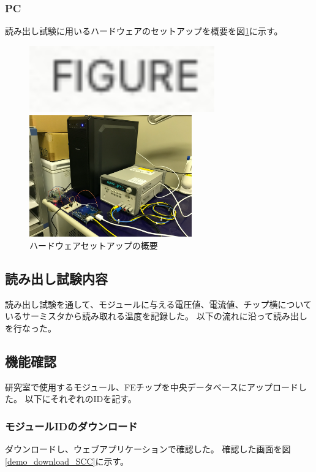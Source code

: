 \subsubsection{PC}
読み出し試験に用いるハードウェアのセットアップを概要を図\ref{readout_setup_overview}に示す。

\begin{figure}[bpt]\centering
  \begin{minipage}{0.5\hsize}
    \includegraphics[width=8cm]{figure}
  \end{minipage}
  \begin{minipage}{0.5\hsize}
    \includegraphics[width=7cm]{HW_setup_pic}
  \end{minipage}
\caption[ハードウェアセットアップの概要]{ハードウェアセットアップの概要}
\label{readout_setup_overview}
\end{figure}

\subsection{読み出し試験内容}
読み出し試験を通して、モジュールに与える電圧値、電流値、チップ横についているサーミスタから読み取れる温度を記録した。
以下の流れに沿って読み出しを行なった。

\subsection{機能確認}
研究室で使用するモジュール、FEチップを中央データベースにアップロードした。
以下にそれぞれのIDを記す。

\subsubsection{モジュールIDのダウンロード}
ダウンロードし、ウェブアプリケーションで確認した。
確認した画面を図\ref{demo_download_SCC}に示す。

